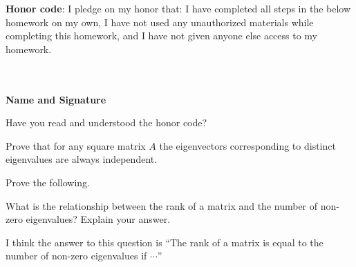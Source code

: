 \documentclass[solution,addpoints,12pt]{exam}
\begin{document}
\noindent \textbf{Honor code}: I pledge on my honor that: I have completed all steps in the below homework on my own, I have not used any unauthorized materials while completing this homework, and I have not given anyone else access to my homework.
\\~\\~\\
\begin{flushright}
\textbf{Name and Signature}

\end{flushright}


\begin{questions}

\question[1] Have you read and understood the honor code?
\begin{solution}

\end{solution}


\question[1] Prove that for any square matrix $A$ the eigenvectors corresponding to distinct eigenvalues are always independent. 
\begin{solution}

\end{solution}

\question[2] Prove the following. 

\question[2] What is the relationship between the rank of a matrix and the number of non-zero eigenvalues? Explain your answer.
\begin{solution}
I think the answer to this question is ``The rank of a matrix is equal to the number of non-zero eigenvalues if $\cdots$''
\end{solution}


\end{questions}
\end{document}
